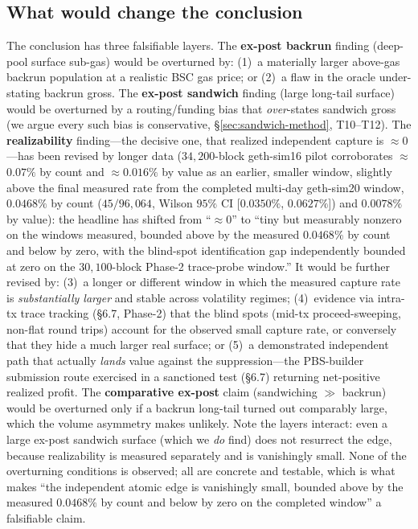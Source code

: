 \documentclass[11pt]{article}
\begin{document}
\subsection{What would change the conclusion}
The conclusion has three falsifiable layers. The \textbf{ex-post backrun} finding
(deep-pool surface sub-gas) would be overturned by: (1)~a materially larger above-gas
backrun population at a realistic BSC gas price; or (2)~a flaw in the oracle
under-stating backrun gross. The \textbf{ex-post sandwich} finding (large long-tail
surface) would be overturned by a routing/funding bias that \emph{over}-states sandwich
gross (we argue every such bias is conservative, \S\ref{sec:sandwich-method},
T10--T12). The \textbf{realizability} finding---the decisive one, that realized
independent capture is $\approx 0$---has been revised by longer data
($34{,}200$-block geth-sim16 pilot corroborates $\approx$$0.07\%$ by count and
$\approx$$0.016\%$ by value as an earlier, smaller window, slightly above the final measured
rate from the completed multi-day geth-sim20 window, $0.0468\%$ by count ($45/96{,}064$, Wilson
$95\%$ CI [$0.0350\%$, $0.0627\%$]) and $0.0078\%$ by value): the
headline has shifted from ``$\approx 0$'' to ``tiny but measurably nonzero on the
windows measured, bounded above by the measured $0.0468\%$ by
count and below by zero, with the blind-spot identification gap independently bounded
at zero on the $30{,}100$-block Phase-2 trace-probe window.'' It would be further revised by: (3)~a longer or
different window in which the measured capture rate is \emph{substantially larger} and
stable across volatility regimes; (4)~evidence via intra-tx trace tracking (\S6.7,
Phase-2) that the blind spots (mid-tx proceed-sweeping, non-flat round trips) account for
the observed small capture rate, or conversely that they hide a much larger real surface;
or (5)~a demonstrated
independent path that actually \emph{lands} value against the suppression---the
PBS-builder submission route exercised in a sanctioned test (\S6.7) returning
net-positive realized profit. The \textbf{comparative ex-post} claim (sandwiching
$\gg$ backrun) would be overturned only if a backrun long-tail turned out comparably
large, which the volume asymmetry makes unlikely. Note the layers interact: even a
large ex-post sandwich surface (which we \emph{do} find) does not resurrect the edge,
because realizability is measured separately and is vanishingly small. None of the
overturning conditions is observed; all are concrete and testable, which is what makes
``the independent atomic edge is vanishingly small, bounded above by the measured
$0.0468\%$ by count and below by zero on the completed window'' a
falsifiable claim.
\end{document}
